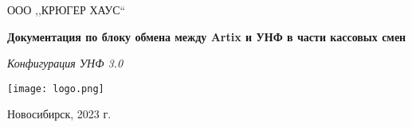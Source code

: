 \begin{titlepage}
\begin{center}
\large
ООО ,,КРЮГЕР ХАУС``


\vspace{2.25cm}

\textbf{Документация по блоку обмена между Artix и УНФ
		в части кассовых смен} 

\textit{Конфигурация УНФ 3.0}
\vfill    

{\texttt{[image: logo.png]}}  

\end{center}
\vfill

\newlength{\ML}


\begin{center}
Новосибирск, 2023 г.
\end{center}
\end{titlepage}